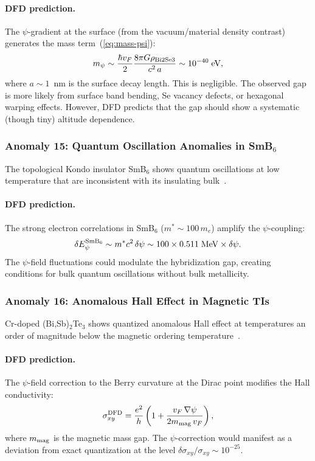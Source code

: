 \documentclass[aps,prb,twocolumn,superscriptaddress,floatfix,nofootinbib,longbibliography]{revtex4-2}
\begin{document}
\paragraph{DFD prediction.}
The $\psi$-gradient at the surface (from the vacuum/material density
contrast) generates the mass term~(\ref{eq:mass-psi}):
\begin{equation}
m_\psi \sim \frac{\hbar v_F}{2}\frac{8\pi G\rho_{\rm Bi2Se3}}{c^2\,a}
\sim 10^{-40}\;\text{eV},
\label{eq:mass-bi2se3}
\end{equation}
where $a \sim 1$~nm is the surface decay length.  This is negligible.
The observed gap is more likely from surface band bending, Se vacancy
defects, or hexagonal warping effects.  However, DFD predicts that the
gap should show a systematic (though tiny) altitude dependence.

\subsubsection{Anomaly 15: Quantum Oscillation Anomalies in SmB$_6$}

The topological Kondo insulator SmB$_6$ shows quantum oscillations
at low temperature that are inconsistent with its insulating
bulk~\cite{Li2014,Tan2015}.

\paragraph{DFD prediction.}
The strong electron correlations in SmB$_6$ ($m^* \sim 100\,m_e$)
amplify the $\psi$-coupling:
\begin{equation}
\delta E_\psi^{\rm SmB_6} \sim m^*c^2\,\delta\psi
\sim 100 \times 0.511\;\text{MeV} \times \delta\psi.
\label{eq:smb6}
\end{equation}
The $\psi$-field fluctuations could modulate the hybridization gap,
creating conditions for bulk quantum oscillations without bulk
metallicity.

\subsubsection{Anomaly 16: Anomalous Hall Effect in Magnetic TIs}

Cr-doped (Bi,Sb)$_2$Te$_3$ shows quantized anomalous Hall effect at
temperatures an order of magnitude below the magnetic ordering
temperature~\cite{Chang2013,Bestwick2015}.

\paragraph{DFD prediction.}
The $\psi$-field correction to the Berry curvature at the Dirac point
modifies the Hall conductivity:
\begin{equation}
\sigma_{xy}^{\rm DFD} = \frac{e^2}{h}\left(1 + \frac{v_F\,\nabla\psi}
{2m_{\rm mag}\,v_F}\right),
\label{eq:hall-psi}
\end{equation}
where $m_{\rm mag}$ is the magnetic mass gap.  The $\psi$-correction
would manifest as a deviation from exact quantization at the level
$\delta\sigma_{xy}/\sigma_{xy} \sim 10^{-25}$.
\end{document}
